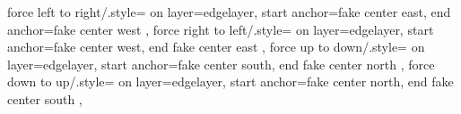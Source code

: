{{    %
    force left to right/.style={
      on layer=edgelayer,
      start anchor=fake center east,
      end anchor=fake center west
    },
    force right to left/.style={
      on layer=edgelayer,
      start anchor=fake center west,
      end fake center east
    },
    force up to down/.style={
      on layer=edgelayer,
      start anchor=fake center south,
      end fake center north
    },
    force down to up/.style={
      on layer=edgelayer,
      start anchor=fake center north,
      end fake center south
    },
}}
